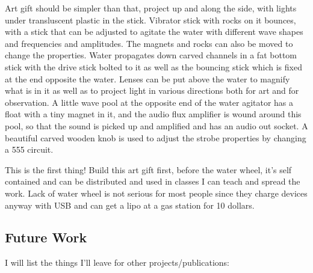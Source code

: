 Art gift should be simpler than that, project up and along the side,
with lights under transluscent plastic in the stick. Vibrator stick with
rocks on it bounces, with a stick that can be adjusted to agitate the
water with different wave shapes and frequencies and amplitudes. The
magnets and rocks can also be moved to change the properties. Water
propagates down carved channels in a fat bottom stick with the drive
stick bolted to it as well as the bouncing stick which is fixed at the
end opposite the water. Lenses can be put above the water to magnify
what is in it as well as to project light in various directions both for
art and for observation. A little wave pool at the opposite end of the
water agitator has a float with a tiny magnet in it, and the audio flux
amplifier is wound around this pool, so that the sound is picked up and
amplified and has an audio out socket. A beautiful carved wooden knob is
used to adjust the strobe properties by changing a 555 circuit.

This is the first thing! Build this art gift first, before the water
wheel, it's self contained and can be distributed and used in classes I
can teach and spread the work. Lack of water wheel is not serious for
most people since they charge devices anyway with USB and can get a lipo
at a gas station for 10 dollars.

\subsection{Future Work}\label{future-work}

I will list the things I'll leave for other projects/publications:

